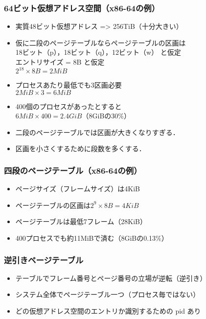 \documentclass[unicode,handout]{beamer}                   %
\begin{document}
\begin{frame}
  \frametitle{64ビット仮想アドレス空間（x86-64の例）}
  \begin{itemize}
  \item 実質48ビット仮想アドレス => 256TiB（十分大きい）
  \item 仮に二段のページテーブルならページテーブルの区画は \\
    18ビット（p），18ビット（q），12ビット（w） と仮定 \\
    エントリサイズ = 8B  と仮定 \\
    $2^{18} \times 8B = 2MiB$
  \item プロセスあたり最低でも3区画必要 \\
    $2MiB \times 3 = 6MiB$
  \item 400個のプロセスがあったとすると \\
    $6MiB \times 400 = 2.4GiB$（8GiBの30\%）
  \item 二段のページテーブルでは区画が大きくなりすぎる．
  \item 区画を小さくするために段数を多くする．
  \end{itemize}
\end{frame}

\begin{frame}
  \frametitle{四段のページテーブル（x86-64の例）}
  \begin{itemize}
  \item ページサイズ（フレームサイズ）は4KiB
  \item ページテーブルの区画は$2^9 \times 8B = 4KiB$
  \item ページテーブルは最低7フレーム（28KiB）
  \item 400プロセスでも約11MiBで済む（8GiBの0.13\%）
  \end{itemize}
\end{frame}

\begin{frame}
  \frametitle{逆引きページテーブル}
  \begin{itemize}
  \item テーブルでフレーム番号とページ番号の立場が逆転（逆引き）
  \item システム全体でページテーブル一つ（プロセス毎ではない）
  \item どの仮想アドレス空間のエントリか識別するための pid あり
  \end{itemize}
\end{frame}
\end{document}
